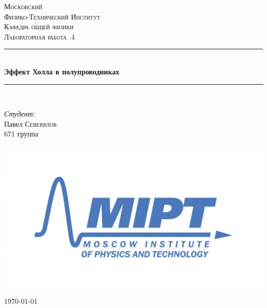 \documentclass[a4paper, 12pt]{article}
\newenvironment{bottompar}{\par\vspace*{\fill}}{\clearpage}
\begin{document}
\begin{titlepage}

\newcommand{\HRule}{\rule{\linewidth}{0.5mm}} %

\center %
 

\textsc{\LARGE Московский \\[0.5cm] Физико-Технический Институт}\\[1,5cm] %
\textsc{\Large Кафедра общей физики}\\[0.5cm] %
\textsc{\large Лабораторная работа .4}\\[0.5cm] %


\HRule
\\[0.4cm]
{ \huge \bfseries Эффект Холла в полупроводниках}
\\[0.2cm] %
\HRule
\\[1.5cm]


 


	\begin{flushleft} \large
	\emph{Студент:}\\
	Павел \textsc{Северилов} \\
	671 группа
	\end{flushleft}



\begin{bottompar}
	\begin{center}
		\includegraphics[width = 80 mm]{logo.jpg}
	\end{center}
	{\large \today}

\end{bottompar}
\vfill %

\end{titlepage}
\end{document}
